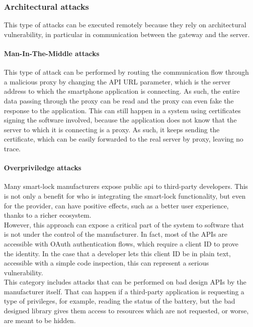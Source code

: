 \subsubsection{Architectural attacks}
This type of attacks can be executed remotely because they rely on architectural vulnerability, in particular in communication between the gateway and the server. 

\paragraph{Man-In-The-Middle attacks}
This type of attack can be performed by routing the communication flow through a malicious proxy by changing the API URL parameter, which is the server address to which the smartphone application is connecting\cite{mitm}. As such, the entire data passing through the proxy can be read and the proxy can even fake the response to the application. This can still happen in a system using certificates signing the software involved, because the application does not know that the server to which it is connecting is a proxy. As such, it keeps sending the certificate, which can be easily forwarded to the real server by proxy, leaving no trace. 

\paragraph{Overpriviledge attacks}
Many smart-lock manufacturers expose public \acrshort{api} to third-party developers. This is not only a benefit for who is integrating the smart-lock functionality, but even for the provider, can have positive effects, such as a better user experience, thanks to a richer ecosystem.
\\ However, this approach can expose a critical part of the system to software that is not under the control of the manufacturer. In fact, most of the APIs are accessible with OAuth authentication flows, which require a client ID to prove the identity. In the case that a developer lets this client ID be in plain text, accessible with a simple code inspection, this can represent a serious vulnerability.
\\ This category includes attacks that can be performed on bad design APIs by the manufacturer itself. That can happen if a third-party application is requesting a type of privileges, for example, reading the status of the battery, but the bad designed library gives them access to resources which are not requested, or worse, are meant to be hidden.\cite{7546527}

